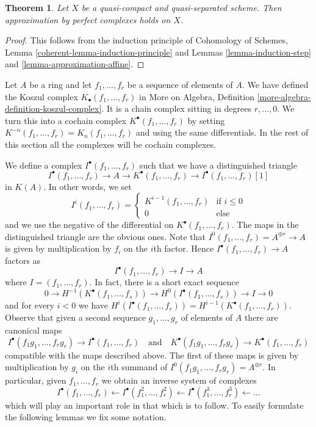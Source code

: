 \documentclass{amsart}
\theoremstyle{plain}
\newtheorem{theorem}[subsection]{Theorem}
\theoremstyle{definition}
\theoremstyle{remark}
\numberwithin{equation}{subsection}
\begin{document}
\begin{theorem}
\label{theorem-approximation}
Let $X$ be a quasi-compact and quasi-separated scheme.
Then approximation by perfect complexes holds on $X$.
\end{theorem}

\begin{proof}
This follows from the induction principle of
Cohomology of Schemes, Lemma \ref{coherent-lemma-induction-principle}
and Lemmas \ref{lemma-induction-step} and \ref{lemma-approximation-affine}.
\end{proof}


\noindent
Let $A$ be a ring and let $f_1, \ldots, f_r$ be a sequence of elements
of $A$. We have defined the Koszul complex
$K_\bullet(f_1, \ldots, f_r)$ in
More on Algebra, Definition \ref{more-algebra-definition-koszul-complex}.
It is a chain complex sitting in degrees $r, \ldots, 0$.
We turn this into a cochain complex $K^\bullet(f_1, \ldots, f_r)$
by setting $K^{-n}(f_1, \ldots, f_r) = K_n(f_1, \ldots, f_r)$
and using the same differentials. In the rest of this section all
the complexes will be cochain complexes.

\medskip\noindent
We define a complex $I^\bullet(f_1, \ldots, f_r)$
such that we have a distinguished triangle
$$
I^\bullet(f_1, \ldots, f_r) \to
A \to
K^\bullet(f_1, \ldots, f_r) \to
I^\bullet(f_1, \ldots, f_r)[1]
$$
in $K(A)$.
In other words, we set
$$
I^i(f_1, \ldots, f_r) =
\left\{
\begin{matrix}
K^{i - 1}(f_1, \ldots, f_r) & \text{if } i \leq 0 \\
0 & \text{else}
\end{matrix}
\right.
$$
and we use the negative of the differential on $K^\bullet(f_1, \ldots, f_r)$.
The maps in the distinguished triangle are the obvious ones. Note that
$I^0(f_1, \ldots, f_r) = A^{\oplus r} \to A$ is given by
multiplication by $f_i$ on the $i$th factor.
Hence $I^\bullet(f_1, \ldots, f_r) \to A$ factors as
$$
I^\bullet(f_1, \ldots, f_r) \to I \to A
$$
where $I = (f_1, \ldots, f_r)$. In fact, there is a short exact sequence
$$
0 \to H^{-1}(K^\bullet(f_1, \ldots, f_s)) \to
H^0(I^\bullet(f_1, \ldots, f_s)) \to I \to 0
$$
and for every $i < 0$ we have
$H^i(I^\bullet(f_1, \ldots, f_r)) = H^{i - 1}(K^\bullet(f_1, \ldots, f_r))$.
Observe that given a second sequence $g_1, \ldots, g_r$ of elements of $A$
there are canonical maps
$$
I^\bullet(f_1g_1, \ldots, f_rg_r) \to I^\bullet(f_1, \ldots, f_r)
\quad\text{and}\quad
K^\bullet(f_1g_1, \ldots, f_rg_r) \to K^\bullet(f_1, \ldots, f_r)
$$
compatible with the maps described above. The first of these maps is
given by multiplication by $g_i$ on the $i$th summand of
$I^0(f_1g_1, \ldots, f_rg_r) = A^{\oplus r}$. In particular, given
$f_1, \ldots, f_r$ we obtain an inverse system of complexes
\begin{equation}
\label{equation-system}
I^\bullet(f_1, \ldots, f_r) \leftarrow
I^\bullet(f_1^2, \ldots, f_r^2) \leftarrow
I^\bullet(f_1^3, \ldots, f_r^3) \leftarrow \ldots
\end{equation}
which will play an important role in that which is to follow.
To easily formulate the following lemmas we fix some notation.
\end{document}
